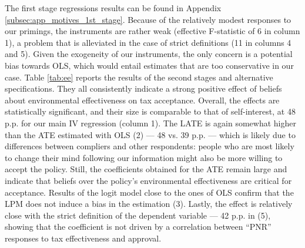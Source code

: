 \documentclass[11pt]{article}
\begin{document}

The first stage regressions results can be found in Appendix \ref{subsec:app_motives_1st_stage}. Because of the relatively modest responses to our primings, the instruments are rather weak (effective F-statistic of 6 in column 1), a problem that is alleviated in the case of strict definitions (11 in columns 4 and 5). Given the exogeneity of our instruments, the only concern is a potential bias towards OLS, which would entail estimates that are too conservative in our case. Table \ref{tab:ee} reports the results of the second stages and alternative specifications. They all consistently indicate a strong positive effect of beliefs about environmental effectiveness on tax acceptance. Overall, the effects are statistically significant, and their size is comparable to that of self-interest, at 48 p.p. for our main IV regression (column 1). The LATE is again somewhat higher than the ATE estimated with OLS (2) --- 48 vs. 39 p.p. --- which is likely due to differences between compliers and other respondents: people who are most likely to change their mind following our information might also be more willing to accept the policy. Still, the coefficients obtained for the ATE remain large and indicate that beliefs over the policy's environmental effectiveness are critical for acceptance. Results of the logit model close to the ones of OLS confirm that the LPM does not induce a bias in the estimation (3). Lastly, the effect is relatively close with the strict definition of the dependent variable --- 42 p.p. in (5), showing that the coefficient is not driven by a correlation between ``PNR'' responses to tax effectiveness and approval.

\end{document}
